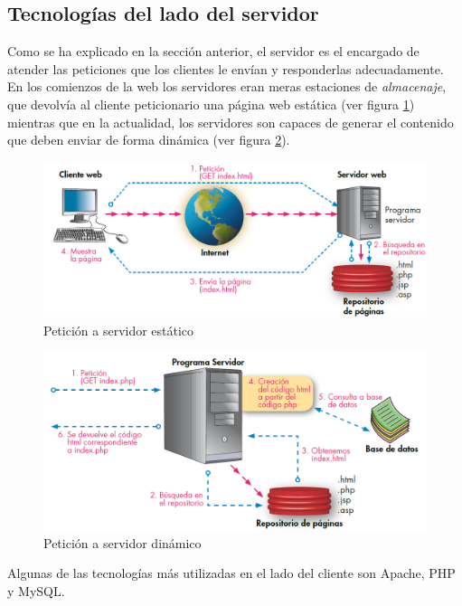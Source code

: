 \subsection{Tecnologías del lado del servidor}
Como se ha explicado en la sección anterior, el servidor es el encargado de atender las peticiones que los clientes le envían y responderlas adecuadamente. 
En los comienzos de la web los servidores eran meras estaciones de \textit{almacenaje}, que devolvía al cliente peticionario una página web estática (ver figura \ref{fig:static-server}) mientras que en la actualidad, los servidores son capaces de generar el contenido que deben enviar de forma dinámica (ver figura \ref{fig:dynamic-server}).

\begin{figure}[h!btp]
\centering
\includegraphics[scale=0.4, fbox={\fboxrule} 4mm]{images/03-antecedentes/12-html_request.png}
\caption{Petición a servidor estático}
\label{fig:static-server}
\end{figure}

\begin{figure}[h!btp]
\centering
\includegraphics[scale=0.5, fbox={\fboxrule} 4mm]{images/03-antecedentes/13-html_dynamic_request.png}
\caption{Petición a servidor dinámico}
\label{fig:dynamic-server}
\end{figure}

Algunas de las tecnologías más utilizadas en el lado del cliente son Apache, PHP y MySQL.

